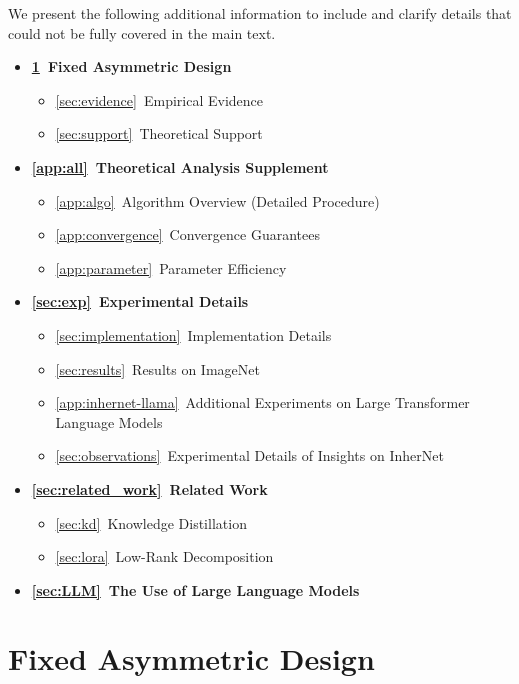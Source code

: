 \documentclass{article} %
\begin{document}
We present the following additional information to include and clarify details that could not be fully covered in the main text.
\begin{tcolorbox}[colback=lightpink, colframe=darkred, title=\textbf{Content}]
\begin{itemize}[leftmargin=*]
\item \textbf{\ref{sec:asymmetric}~Fixed Asymmetric Design}
\begin{itemize}
    \item \ref{sec:evidence}~Empirical Evidence
    \item \ref{sec:support}~Theoretical Support
\end{itemize}
\item \textbf{\ref{app:all}~Theoretical Analysis Supplement} 
\begin{itemize}
    \item \ref{app:algo}~Algorithm Overview (Detailed Procedure)
    \item \ref{app:convergence}~Convergence Guarantees
    \item \ref{app:parameter}~Parameter Efficiency
\end{itemize}
\item \textbf{\ref{sec:exp}~Experimental Details}
\begin{itemize}
    \item \ref{sec:implementation}~Implementation Details 
    \item \ref{sec:results}~Results on ImageNet 
    \item \ref{app:inhernet-llama}~Additional Experiments on Large Transformer Language Models 
    \item \ref{sec:observations}~Experimental Details of Insights on InherNet  
\end{itemize}
\item {\textbf{\ref{sec:related_work}~Related Work}
    \begin{itemize}
        \item \ref{sec:kd}~Knowledge Distillation
        \item \ref{sec:lora}~Low-Rank Decomposition
    \end{itemize} }
\item {
\textbf{\ref{sec:LLM}~The Use of Large Language Models}
}

\end{itemize}
\end{tcolorbox}

\section{Fixed Asymmetric Design}
\label{sec:asymmetric}
\end{document}
